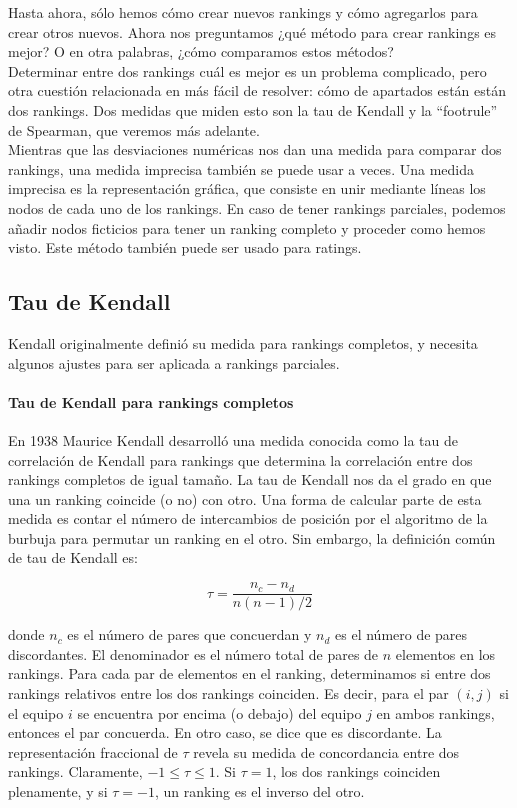  Hasta ahora, sólo hemos cómo crear nuevos rankings y cómo agregarlos para crear otros nuevos. Ahora nos preguntamos ¿qué método para crear rankings es mejor? O en otra palabras, ¿cómo comparamos estos métodos?\\
 
 Determinar entre dos rankings cuál es mejor es un problema complicado, pero otra cuestión relacionada en más fácil de resolver: cómo de apartados están están dos rankings. Dos medidas que miden esto son la tau de Kendall y la ``footrule'' de Spearman, que veremos más adelante.\\
 
 Mientras que las desviaciones numéricas nos dan una medida para comparar dos rankings, una medida imprecisa también se puede usar a veces. Una medida imprecisa es la representación gráfica, que consiste en unir mediante líneas los nodos de cada uno de los rankings. En caso de tener rankings parciales, podemos añadir nodos ficticios para tener un ranking completo y proceder como hemos visto. Este método también puede ser usado para ratings.
 
 \subsection{Tau de Kendall} 
 
 Kendall originalmente definió su medida para rankings completos, y necesita algunos ajustes para ser aplicada a rankings parciales.
 
 \paragraph{Tau de Kendall para rankings completos}
 
 En 1938 Maurice Kendall desarrolló una medida conocida como la tau de correlación de Kendall para rankings que determina la correlación entre dos rankings completos de igual tamaño. La tau de Kendall nos da el grado en que una un ranking coincide (o no) con otro. Una forma de calcular parte de esta medida es contar el número de intercambios de posición por el algoritmo de la burbuja para permutar un ranking en el otro. Sin embargo, la definición común de tau de Kendall es:
 
 \[ \tau = \dfrac{n_c - n_d}{n(n-1)/2} \]
 
 donde $n_c$ es el número de pares que concuerdan y $n_d$ es el número de pares discordantes. El denominador es el número total de pares de $n$ elementos en los rankings. Para cada par de elementos en el ranking, determinamos si entre dos rankings relativos entre los dos rankings coinciden. Es decir, para el par $(i,j)$ si el equipo $i$ se encuentra por encima (o debajo) del equipo $j$ en ambos rankings, entonces el par concuerda. En otro caso, se dice que es discordante. La representación fraccional de $\tau$ revela su medida de concordancia entre dos rankings.  Claramente, $-1 \leq \tau \leq 1$. Si $\tau = 1$, los dos rankings coinciden plenamente, y si $\tau = -1$, un ranking es el inverso del otro.\\
 
